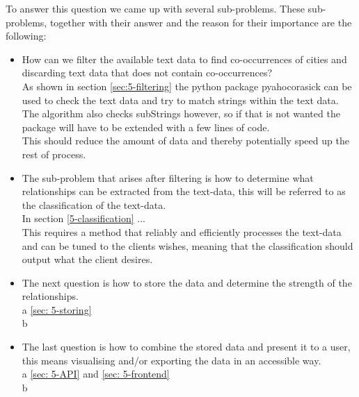 To answer this question we came up with several sub-problems. These sub-problems, together with their answer and the reason for their importance are the following:
\begin{itemize}
    \item How can we filter the available text data to find co-occurrences of cities and discarding text data that does not contain co-occurrences? \\
    
    As shown in section \ref{sec:5-filtering} the python package pyahocorasick can be used to check the text data and try to match strings within the text data. The algorithm also checks subStrings however, so if that is not wanted the package will have to be extended with a few lines of code. \\
    
    This should reduce the amount of data and thereby potentially speed up the rest of process.
    
    \item The sub-problem that arises after filtering is how to determine what relationships can be extracted from the text-data, this will be referred to as the classification of the text-data. \\
    
    In section \ref{5-classification} ... \todo{}\\
    
    This requires a method that reliably and efficiently processes the text-data and can be tuned to the clients wishes, meaning that the classification should output what the client desires. 
    
    \item The next question is how to store the data and determine the strength of the relationships. \\
    
    a \ref{sec: 5-storing}\\
    
    b
    
    \item The last question is how to combine the stored data and present it to a user, this means visualising and/or exporting the data in an accessible way.\\
    
    a \ref{sec: 5-API} and \ref{sec: 5-frontend}\\
    
    b
\end{itemize}

